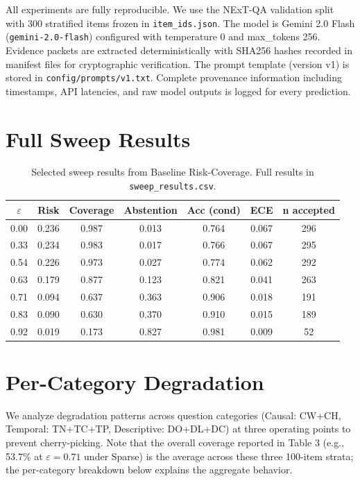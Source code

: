 \documentclass{article}
\begin{document}
All experiments are fully reproducible. We use the NExT-QA validation split with 300 stratified items frozen in \texttt{item\_ids.json}. The model is Gemini 2.0 Flash (\texttt{gemini-2.0-flash}) configured with temperature 0 and max\_tokens 256. Evidence packets are extracted deterministically with SHA256 hashes recorded in manifest files for cryptographic verification. The prompt template (version v1) is stored in \texttt{config/prompts/v1.txt}. Complete provenance information including timestamps, API latencies, and raw model outputs is logged for every prediction.

\appendix
\section{Full Sweep Results}
\label{app:sweep}

\begin{table}[h]
\centering
\small
\begin{tabular}{ccccccc}
\toprule
$\varepsilon$ & Risk & Coverage & Abstention & Acc (cond) & ECE & n accepted \\
\midrule
0.00 & 0.236 & 0.987 & 0.013 & 0.764 & 0.067 & 296 \\
0.33 & 0.234 & 0.983 & 0.017 & 0.766 & 0.067 & 295 \\
0.54 & 0.226 & 0.973 & 0.027 & 0.774 & 0.062 & 292 \\
0.63 & 0.179 & 0.877 & 0.123 & 0.821 & 0.041 & 263 \\
0.71 & 0.094 & 0.637 & 0.363 & 0.906 & 0.018 & 191 \\
0.83 & 0.090 & 0.630 & 0.370 & 0.910 & 0.015 & 189 \\
0.92 & 0.019 & 0.173 & 0.827 & 0.981 & 0.009 & 52 \\
\bottomrule
\end{tabular}
\caption{Selected sweep results from Baseline Risk-Coverage. Full results in \texttt{sweep\_results.csv}.}
\label{tab:full-sweep}
\end{table}

\section{Per-Category Degradation}
\label{app:category}

We analyze degradation patterns across question categories (Causal: CW+CH, Temporal: TN+TC+TP, Descriptive: DO+DL+DC) at three operating points to prevent cherry-picking. Note that the overall coverage reported in Table 3 (e.g., 53.7\% at $\varepsilon=0.71$ under Sparse) is the average across these three 100-item strata; the per-category breakdown below explains the aggregate behavior.
\end{document}
